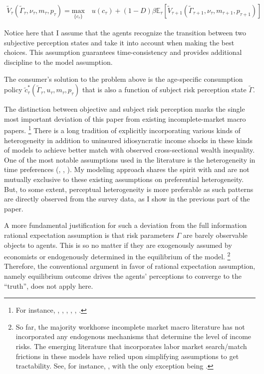 \begin{equation}
\begin{split}
\tilde V_{\tau}(\tilde \Gamma_\tau, \nu_\tau, m_\tau, p_\tau) = \underset{\{c_\tau\}}{\textrm{max}} \quad u(c_\tau) + (1-D)\beta \mathbb{E}_{\tau}\left[\tilde V_{\tau+1}(\tilde \Gamma_{\tau+1}, \nu_\tau,m_{\tau+1}, p_{\tau+1})\right] 
\end{split}
\end{equation}

Notice here that I assume that the agents recognize the transition between two subjective perception states and take it into account when making the best choices. This assumption guarantees time-consistency and provides additional discipline to the model assumption.  

The consumer's solution to the problem above is the age-specific consumption policy $\tilde c_\tau^*(\tilde \Gamma_\tau,u_\tau, m_\tau,p_\tau)$ that is also a function of subject risk perception state $\tilde \Gamma$.

The distinction between objective and subject risk perception marks the single most important deviation of this paper from existing incomplete-market macro papers. \footnote{For instance, \cite{bewley1976permanent}, \cite{huggett1993risk}, \cite{aiyagari1994uninsured}, \cite{krusell1998income},  \cite{krueger2016macroeconomics},  \cite{carroll2017distribution}.} There is a long tradition of explicitly incorporating various kinds of heterogeneity in addition to uninsured idiosyncratic income shocks in these kinds of models to achieve better match with observed cross-sectional wealth inequality. One of the most notable assumptions used in the literature is the heterogeneity in time preferences (\cite{krusell1998income}, \cite{carroll2017distribution}, \cite{krueger2016macroeconomics}). My modeling approach shares the spirit with and are not mutually exclusive to these existing assumptions on preferential heterogeneity. But, to some extent, perceptual heterogeneity is more preferable as such patterns are directly observed from the survey data, as I show in the previous part of the paper.  


A more fundamental justification for such a deviation from the full information rational expectation assumption is that risk parameters $\Gamma$ are barely observable objects to agents. This is so no matter if they are exogenously assumed by economists or endogenously determined in the equilibrium of the model. \footnote{So far, the majority workhorse incomplete market macro literature has not incorporated any endogenous mechanisms that determine the level of income risks. The emerging literature that incorporates labor market search/match frictions in these models have relied upon simplifying assumptions to get tractability. See, for instance, \cite{mckay2017time,acharya2020understanding,ravn2021macroeconomic},  with the only exception being \cite{ravn2017job}.} Therefore, the conventional argument in favor of rational expectation assumption, namely equilibrium outcome drives the agents' perceptions to converge to the ``truth'', does not apply here. 

